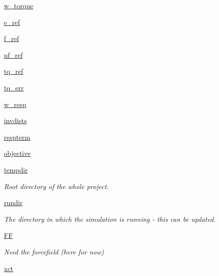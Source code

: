 \begin{DoxyCompactItemize}
\hyperlink{classforcebalance_1_1abinitio_1_1AbInitio_a67643b98cce62c06c95f085d3a3e9722}{w\-\_\-torque}
\item 
\hyperlink{classforcebalance_1_1abinitio_1_1AbInitio_a71d13d3fabd98146c68bb5fc784f6732}{e\-\_\-ref}
\item 
\hyperlink{classforcebalance_1_1abinitio_1_1AbInitio_a6631ee11ee5646d97ea0fa5c9b22fc6a}{f\-\_\-ref}
\item 
\hyperlink{classforcebalance_1_1abinitio_1_1AbInitio_a5a77f4b99a5b01245ab0435d632122a1}{nf\-\_\-ref}
\item 
\hyperlink{classforcebalance_1_1abinitio_1_1AbInitio_aadda7244869b583a4533317615c421e1}{tq\-\_\-ref}
\item 
\hyperlink{classforcebalance_1_1abinitio_1_1AbInitio_ae60e834d5b5bf13f8fb70d403a97db28}{tq\-\_\-err}
\item 
\hyperlink{classforcebalance_1_1abinitio_1_1AbInitio_a176a442bd340d2f9b54319e76feb46ae}{w\-\_\-resp}
\item 
\hyperlink{classforcebalance_1_1abinitio_1_1AbInitio_aa01ee600ba0f429ffc81135af9d8109b}{invdists}
\item 
\hyperlink{classforcebalance_1_1abinitio_1_1AbInitio_a689e3849518b33539442a473a41ed32d}{respterm}
\item 
\hyperlink{classforcebalance_1_1abinitio_1_1AbInitio_acbbd447b9f66bc4699992f3b64bb256d}{objective}
\item 
\hyperlink{classforcebalance_1_1target_1_1Target_aa1f01b5b78db253b5b66384ed11ed193}{tempdir}
\begin{DoxyCompactList}\small\item\em Root directory of the whole project. \end{DoxyCompactList}\item 
\hyperlink{classforcebalance_1_1target_1_1Target_a6872de5b2d4273b82336ea5b0da29c9e}{rundir}
\begin{DoxyCompactList}\small\item\em The directory in which the simulation is running -\/ this can be updated. \end{DoxyCompactList}\item 
\hyperlink{classforcebalance_1_1target_1_1Target_a38a37919783141ea37fdcf8b00ce0aaf}{F\-F}
\begin{DoxyCompactList}\small\item\em Need the forcefield (here for now) \end{DoxyCompactList}\item 
\hyperlink{classforcebalance_1_1target_1_1Target_aad2e385cfbf7b4a68f1c2cb41133fe82}{xct}

\end{DoxyCompactItemize}
